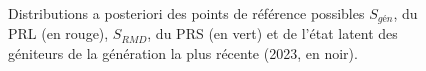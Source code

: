 \documentclass[french,11pt]{book}
\begin{document}
\begin{figure}[htb]

{\centering {} 

}

\caption{Distributions a posteriori des points de référence possibles \(S_{gén}\), du PRL (en rouge), \(S_{RMD}\), du PRS (en vert) et de l'état latent des géniteurs de la génération la plus récente (2023, en noir).}\label{fig:fig-status}
\end{figure}
\end{document}
